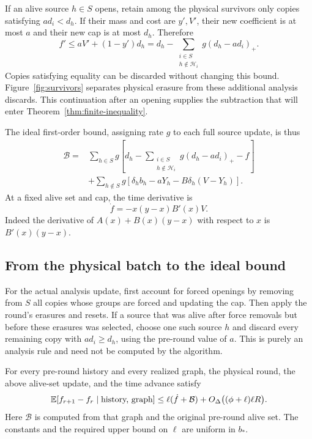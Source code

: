 If an alive source $h\in S$ opens, retain among the physical survivors
only copies satisfying $ad_i<d_h$.  If their mass and cost are $y',V'$,
their new coefficient is at most $a$ and their new cap is at most
$d_h$.  Therefore
\[
 f'\le aV'+(1-y')d_h
 =d_h-\sum_{\substack{i\in S\\h\notin\mathcal H_i}}
            g(d_h-ad_i)_+.
\]
Copies satisfying equality can be discarded without changing this
bound. Figure~\ref{fig:survivors} separates physical erasure from these
additional analysis discards. This continuation after an opening
supplies the subtraction that will enter
Theorem~\ref{thm:finite-inequality}.



The ideal first-order bound, assigning rate $g$ to each full source
update, is thus
\begin{equation}\label{eq:rnd-ideal-generator}
\begin{aligned}
 \mathcal B={}&
 \sum_{h\in S}g\left[
 d_h-\sum_{\substack{i\in S\\h\notin\mathcal H_i}}
                  g(d_h-ad_i)_+-f\right]\\
 &+\sum_{h\notin S}g\left[
 \delta_hb_h-aY_h-B\delta_h(V-Y_h)\right].
\end{aligned}
\end{equation}
At a fixed alive set and cap, the time derivative is
\begin{equation}\label{eq:rnd-time-derivative}
 \dot f=-x(y-x)B'(x)V.
\end{equation}
Indeed the derivative of $A(x)+B(x)(y-x)$ with respect to $x$ is
$B'(x)(y-x)$.

\subsection{From the physical batch to the ideal bound}

For the actual analysis update, first account for forced openings by
removing from $S$ all copies whose groups are forced and updating the
cap.  Then apply the round's erasures and resets.  If a source that
was alive after force removals but before these erasures was selected,
choose one such source $h$ and discard every remaining copy with
$ad_i\ge d_h$, using the pre-round value of $a$.  This is purely an
analysis rule and need not be computed by the algorithm.

\begin{lemma}\label{lem:rnd-batch}
For every pre-round history and every realized graph, the physical
round, the above alive-set update, and the time advance satisfy
\begin{equation}\label{eq:rnd-batch-drift}
 \mathbb E[f_{r+1}-f_r\mid\text{history, graph}]
 \le\ell(\dot f+\mathcal B)
       +O_\Delta\bigl((\phi+\ell)\ell R\bigr).
\end{equation}
Here $\mathcal B$ is computed from that graph and the original
pre-round alive set.  The constants and the required upper bound on
$\ell$ are uniform in $b_*$.
\end{lemma}


